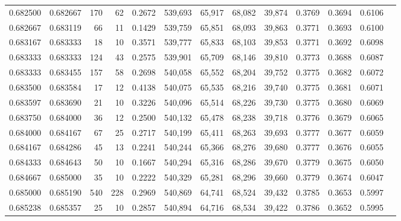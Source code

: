 \begin{tabular}{rrrrrrrrrrrrr}
0.682500 & 0.682667 &   170 &  62 &                                     0.2672 & 539,693 &  65,917 &  68,082 &  39,874 & 0.3769 & 0.3694 & 0.6106 \\
0.682667 & 0.683119 &    66 &  11 &                                     0.1429 & 539,759 &  65,851 &  68,093 &  39,863 & 0.3771 & 0.3693 & 0.6100 \\
0.683167 & 0.683333 &    18 &  10 &                                     0.3571 & 539,777 &  65,833 &  68,103 &  39,853 & 0.3771 & 0.3692 & 0.6098 \\
0.683333 & 0.683333 &   124 &  43 &                                     0.2575 & 539,901 &  65,709 &  68,146 &  39,810 & 0.3773 & 0.3688 & 0.6087 \\
0.683333 & 0.683455 &   157 &  58 &                                     0.2698 & 540,058 &  65,552 &  68,204 &  39,752 & 0.3775 & 0.3682 & 0.6072 \\
0.683500 & 0.683584 &    17 &  12 &                                     0.4138 & 540,075 &  65,535 &  68,216 &  39,740 & 0.3775 & 0.3681 & 0.6071 \\
0.683597 & 0.683690 &    21 &  10 &                                     0.3226 & 540,096 &  65,514 &  68,226 &  39,730 & 0.3775 & 0.3680 & 0.6069 \\
0.683750 & 0.684000 &    36 &  12 &                                     0.2500 & 540,132 &  65,478 &  68,238 &  39,718 & 0.3776 & 0.3679 & 0.6065 \\
0.684000 & 0.684167 &    67 &  25 &                                     0.2717 & 540,199 &  65,411 &  68,263 &  39,693 & 0.3777 & 0.3677 & 0.6059 \\
0.684167 & 0.684286 &    45 &  13 &                                     0.2241 & 540,244 &  65,366 &  68,276 &  39,680 & 0.3777 & 0.3676 & 0.6055 \\
0.684333 & 0.684643 &    50 &  10 &                                     0.1667 & 540,294 &  65,316 &  68,286 &  39,670 & 0.3779 & 0.3675 & 0.6050 \\
0.684667 & 0.685000 &    35 &  10 &                                     0.2222 & 540,329 &  65,281 &  68,296 &  39,660 & 0.3779 & 0.3674 & 0.6047 \\
0.685000 & 0.685190 &   540 & 228 &                                     0.2969 & 540,869 &  64,741 &  68,524 &  39,432 & 0.3785 & 0.3653 & 0.5997 \\
0.685238 & 0.685357 &    25 &  10 &                                     0.2857 & 540,894 &  64,716 &  68,534 &  39,422 & 0.3786 & 0.3652 & 0.5995 \\

\end{tabular}
